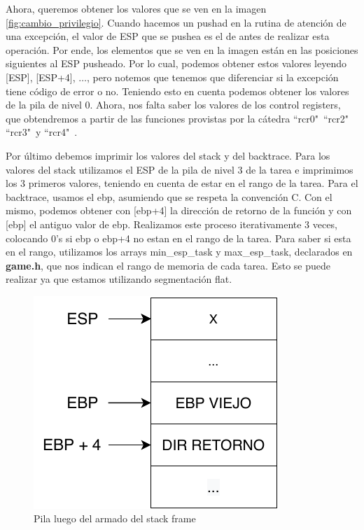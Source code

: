 \documentclass[a4paper]{article}
\begin{document}
\justify
Ahora, queremos obtener los valores que se ven en la imagen \ref{fig:cambio_privilegio}. Cuando hacemos un pushad en la rutina de atención de una excepción, el valor de ESP que se pushea es el de antes de realizar esta operación. Por ende, los elementos que se ven en la imagen están en las posiciones siguientes al ESP pusheado. Por lo cual, podemos obtener estos valores leyendo [ESP], [ESP+4], $\dots$, pero notemos que tenemos que diferenciar si la excepción tiene código de error o no. Teniendo esto en cuenta podemos obtener los valores de la pila de nivel 0. Ahora, nos falta saber los valores de los control registers, que obtendremos a partir de las funciones provistas por la cátedra ``rcr0"\, ``rcr2"\, ``rcr3"\ y ``rcr4"\ .


\justify
Por último debemos imprimir los valores del stack y del backtrace. Para los valores del stack utilizamos el ESP de la pila de nivel $3$ de la tarea e imprimimos los $3$ primeros valores, teniendo en cuenta de estar en el rango de la tarea. Para el backtrace, usamos el ebp, asumiendo que se respeta la convención C. Con el mismo, podemos obtener con [ebp+4] la dirección de retorno de la función y con [ebp] el antiguo valor de ebp. Realizamos este proceso iterativamente 3 veces, colocando 0's si ebp o ebp+4 no estan en el rango de la tarea. Para saber si esta en el rango, utilizamos los arrays min_esp_task y max_esp_task, declarados en \textbf{game.h}, que nos indican el rango de memoria de cada tarea. Esto se puede realizar ya que estamos utilizando segmentación flat.

\begin{figure}[h]
	\centering
	\includegraphics[scale=0.8]{img/pila.pdf}
	\caption{Pila luego del armado del stack frame}
\end{figure}
\end{document}
